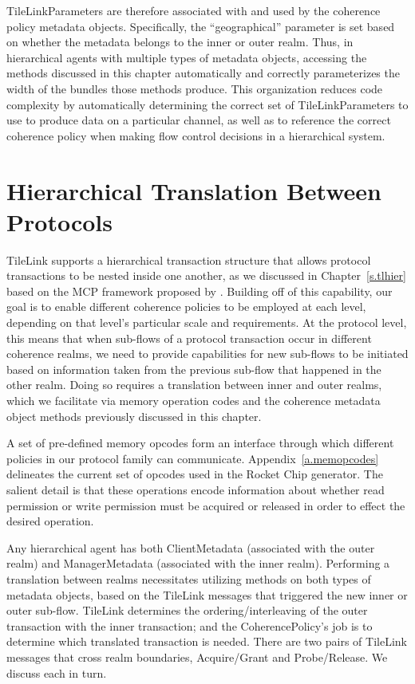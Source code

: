 TileLinkParameters are therefore associated with and used by the coherence policy metadata objects.
Specifically, the ``geographical'' parameter  is set based on whether the metadata belongs to the inner or outer realm.
Thus, in hierarchical agents with multiple types of metadata objects, accessing the methods
discussed in this chapter automatically and correctly parameterizes the width of the bundles those methods produce.
This organization reduces code complexity by automatically determining the correct set of TileLinkParameters to use to produce data on a particular channel,
as well as to reference the correct coherence policy when making flow control decisions in a hierarchical system.

\section{Hierarchical Translation Between Protocols}

TileLink supports a hierarchical transaction structure that allows protocol transactions
to be nested inside one another, as we discussed in Chapter~\ref{s.tlhier}
based on the MCP framework proposed by \cite{beu2011manager}.
Building off of this capability, our goal is to enable different coherence policies to be employed at each level,
depending on that level's particular scale and requirements.
At the protocol level, this means that when sub-flows of a protocol transaction
occur in different coherence realms, we need to provide capabilities for
new sub-flows to be initiated based on information taken from the previous sub-flow
that happened in the other realm.
Doing so requires a translation between inner and outer realms,
which we facilitate via memory operation codes and the
coherence metadata object methods previously discussed in this chapter.

A set of pre-defined memory opcodes
form an interface through which different policies in our protocol family can communicate.
Appendix~\ref{a.memopcodes} delineates the current set of opcodes used in the Rocket Chip generator.
The salient detail is that these operations encode information about whether read permission or write permission
must be acquired or released in order to effect the desired operation.

Any hierarchical agent has both ClientMetadata (associated with the outer realm)
and ManagerMetadata (associated with the inner realm).
Performing a translation between realms necessitates utilizing methods on both types of metadata objects,
based on the TileLink messages that triggered the new inner or outer sub-flow.
TileLink determines the ordering/interleaving of the outer transaction with the inner transaction;
and the CoherencePolicy's job is to determine which translated transaction is needed.
There are two pairs of TileLink messages that cross realm boundaries,
Acquire/Grant and Probe/Release.
We discuss each in turn.

